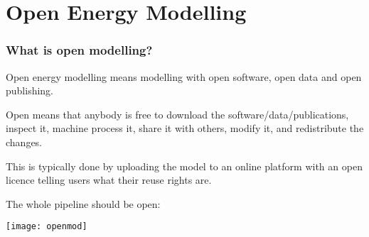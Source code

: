 \documentclass[10pt,aspectratio=169,dvipsnames]{beamer}
\begin{document}
\section{Open Energy Modelling}


\begin{frame}
  \frametitle{What is open modelling?}

  \alert{Open energy modelling} means modelling with open software, open data and open publishing.

  \alert{Open} means that anybody is free to download the software/data/publications, inspect it, machine process it, share it with others, modify it, and redistribute the changes.

  This is typically done by uploading the model to an online platform with an \alert{open licence} telling users what their reuse rights are.

  The \alert{whole pipeline} should be open:
  \vspace{0.5cm}

  \centering
  \texttt{[image: openmod]}

  \vspace{0.1cm}
\end{frame}
\end{document}
